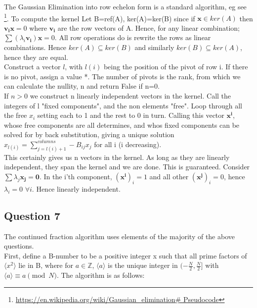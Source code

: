 \documentclass[10pt,a4paper]{report}
\begin{document}
The Gaussian Elimination into row echelon form is a standard algorithm, eg see \footnote{\url{https://en.wikipedia.org/wiki/Gaussian_elimination\# Pseudocode}}. To compute the kernel Let B=ref(A), ker(A)=ker(B) since if $\bm{x} \in ker(A)$ then $\bm{v_i}\bm{x}=0$ where $\bm{v_i}$ are the row vectors of A. Hence, for any linear combination; $\sum( \lambda_i \bm{v_i})\bm{x}=0$. All row operations do is rewrite the rows as linear combinations. Hence $ker(A)\subseteq ker(B)$ and similarly $ker(B)\subseteq ker(A)$, hence they are equal.\\

Construct a vector $l$, with $l(i)$ being the position of the pivot of row i. If there is no pivot, assign a value *. The number of pivots is the rank, from which we can calculate the nullity, n and return False if n=0. \\

If $n>0$ we construct n linearly independent vectors in the kernel. Call the integers of l "fixed components", and the non elements "free". Loop through all the free $x_i$ setting each to 1 and the rest to 0 in turn. Calling this vector $\bm{x^i}$, whose free components are all determines, and whos fixed components can be solved for by back substitution, giving a unique solution $x_{l(i)}=\sum_{j=l(i)+1}^{columns} -B_{ij}x_j$ for all i (i decreasing). \\

This certainly gives us n vectors in the kernel. As long as they are linearly independent, they span the kernel and we are done. This is guaranteed. Consider
$\sum\lambda_j \bm{x_j} =\bm{0}$. In the i'th component, $(\bm{x^i})_i=1$ and all other $(\bm{x^j})_i=0$, hence $\lambda_i=0$ $\forall i$. Hence linearly independent.\\

\subsection*{Question 7}

The continued fraction algorithm uses elements of the majority of the above questions. \\

First, define a B-number to be a positive integer x such that all prime factors of $\langle x^2 \rangle$ lie in B, where for $a\in\mathbb{Z}$, $\langle a \rangle$ is the unique integer in $(-\frac{N}{2}, \frac{N}{2}]$ with $\langle a \rangle \equiv a \pmod N$. The algorithm is as follows:\\
\end{document}
